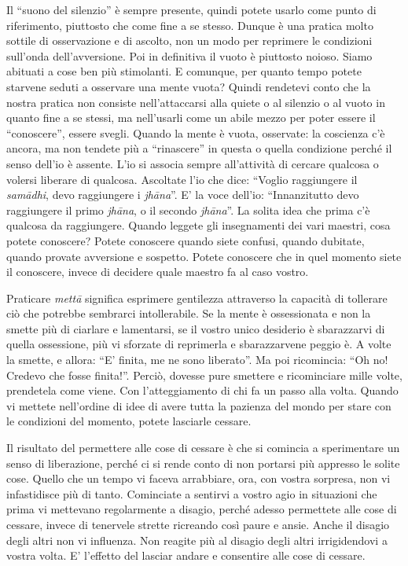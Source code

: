Il ``suono del silenzio'' è sempre presente, quindi potete usarlo come
punto di riferimento, piuttosto che come fine a se stesso. Dunque è una
pratica molto sottile di osservazione e di ascolto, non un modo per
reprimere le condizioni sull'onda dell'avversione. Poi in definitiva il
vuoto è piuttosto noioso. Siamo abituati a cose ben più stimolanti. E
comunque, per quanto tempo potete starvene seduti a osservare una mente
vuota? Quindi rendetevi conto che la nostra pratica non consiste
nell'attaccarsi alla quiete o al silenzio o al vuoto in quanto fine a se
stessi, ma nell'usarli come un abile mezzo per poter essere il
``conoscere'', essere svegli. Quando la mente è vuota, osservate: la
coscienza c'è ancora, ma non tendete più a ``rinascere'' in questa o
quella condizione perché il senso dell'io è assente. L'io si associa
sempre all'attività di cercare qualcosa o volersi liberare di qualcosa.
Ascoltate l'io che dice: ``Voglio raggiungere il \textit{samādhi}, devo
raggiungere i \textit{jhāna}''. E' la voce dell'io: ``Innanzitutto devo raggiungere
il primo \textit{jhāna}, o il secondo \textit{jhāna}''. La solita idea che prima c'è
qualcosa da raggiungere. Quando leggete gli insegnamenti dei vari
maestri, cosa potete conoscere? Potete conoscere quando siete confusi,
quando dubitate, quando provate avversione e sospetto. Potete conoscere
che in quel momento siete il conoscere, invece di decidere quale maestro
fa al caso vostro.

Praticare \textit{mettā} significa esprimere gentilezza attraverso la capacità di
tollerare ciò che potrebbe sembrarci intollerabile. Se la mente è
ossessionata e non la smette più di ciarlare e lamentarsi, se il vostro
unico desiderio è sbarazzarvi di quella ossessione, più vi sforzate di
reprimerla e sbarazzarvene peggio è. A volte la smette, e allora: ``E'
finita, me ne sono liberato''. Ma poi ricomincia: ``Oh no! Credevo che
fosse finita!''. Perciò, dovesse pure smettere e ricominciare mille
volte, prendetela come viene. Con l'atteggiamento di chi fa un passo
alla volta. Quando vi mettete nell'ordine di idee di avere tutta la
pazienza del mondo per stare con le condizioni del momento, potete
lasciarle cessare.

Il risultato del permettere alle cose di cessare è
che si comincia a sperimentare un senso di liberazione, perché ci si
rende conto di non portarsi più appresso le solite cose. Quello che un
tempo vi faceva arrabbiare, ora, con vostra sorpresa, non vi
infastidisce più di tanto. Cominciate a sentirvi a vostro agio in
situazioni che prima vi mettevano regolarmente a disagio, perché adesso
permettete alle cose di cessare, invece di tenervele strette ricreando
così paure e ansie. Anche il disagio degli altri non vi influenza. Non
reagite più al disagio degli altri irrigidendovi a vostra volta. E'
l'effetto del lasciar andare e consentire alle cose di cessare.

